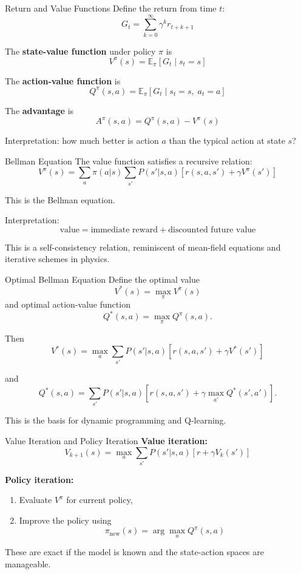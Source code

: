 \documentclass{beamer}
\begin{document}
\begin{frame}{Return and Value Functions}
  Define the return from time $t$:
  \[
  G_t = \sum_{k=0}^\infty \gamma^k r_{t+k+1}
  \]

  The \textbf{state-value function} under policy $\pi$ is
  \[
  V^\pi(s)=\mathbb{E}_\pi[G_t\mid s_t=s]
  \]

  The \textbf{action-value function} is
  \[
  Q^\pi(s,a)=\mathbb{E}_\pi[G_t\mid s_t=s,\; a_t=a]
  \]

  The \textbf{advantage} is
  \[
  A^\pi(s,a)=Q^\pi(s,a)-V^\pi(s)
  \]

  Interpretation: how much better is action $a$ than the typical action at state $s$?
\end{frame}

\begin{frame}{Bellman Equation}
  The value function satisfies a recursive relation:
  \[
  V^\pi(s)=\sum_a \pi(a|s)\sum_{s'} P(s'|s,a)
  \left[r(s,a,s')+\gamma V^\pi(s')\right]
  \]

  This is the Bellman equation.

  Interpretation:
  \[
  \text{value} = \text{immediate reward} + \text{discounted future value}
  \]

  This is a self-consistency relation, reminiscent of mean-field equations and iterative schemes in physics.
\end{frame}

\begin{frame}{Optimal Bellman Equation}
  Define the optimal value
  \[
  V^*(s)=\max_\pi V^\pi(s)
  \]
  and optimal action-value function
  \[
  Q^*(s,a)=\max_\pi Q^\pi(s,a).
  \]

  Then
  \[
  V^*(s)=\max_a \sum_{s'} P(s'|s,a)
  \left[r(s,a,s')+\gamma V^*(s')\right]
  \]

  and
  \[
  Q^*(s,a)=\sum_{s'} P(s'|s,a)
  \left[r(s,a,s')+\gamma \max_{a'}Q^*(s',a')\right].
  \]

  This is the basis for dynamic programming and Q-learning.
\end{frame}

\begin{frame}{Value Iteration and Policy Iteration}
  \textbf{Value iteration:}
  \[
  V_{k+1}(s)=\max_a \sum_{s'} P(s'|s,a)\left[r+\gamma V_k(s')\right]
  \]

  \textbf{Policy iteration:}
  \begin{enumerate}
  \item Evaluate $V^\pi$ for current policy,
  \item Improve the policy using
    \[
    \pi_{\text{new}}(s)=\arg\max_a Q^\pi(s,a)
    \]
  \end{enumerate}

  These are exact if the model is known and the state-action spaces are manageable.
\end{frame}
\end{document}
